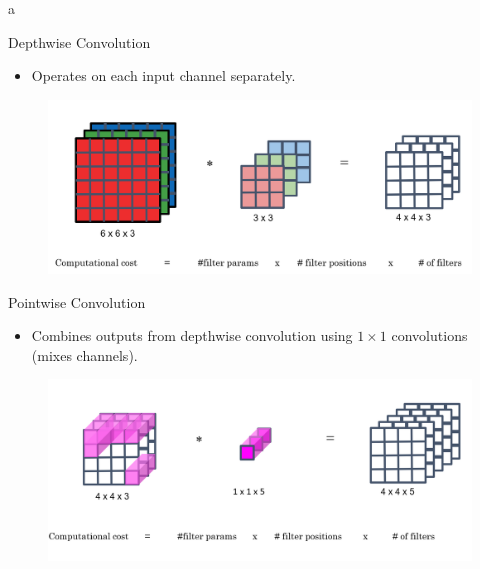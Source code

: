 a\documentclass[10pt]{beamer}
\theoremstyle{remark}
\theoremstyle{definition}
\begin{document}
\begin{frame}{Depthwise Convolution}
\begin{itemize}
    \item Operates on each input channel separately.
\end{itemize}
\begin{figure}
    \centering
    \includegraphics[width=0.8\linewidth]{./images/Depthwise_conv.png}
\end{figure}
\end{frame}


\begin{frame}{Pointwise Convolution}
\begin{itemize}
    \item Combines outputs from depthwise convolution using \(1 \times 1\) convolutions (mixes channels).
\end{itemize}
\begin{figure}
    \centering
    \includegraphics[width=0.8\linewidth]{./images/PointWise_conv.png}
\end{figure}
\end{frame}
\end{document}
